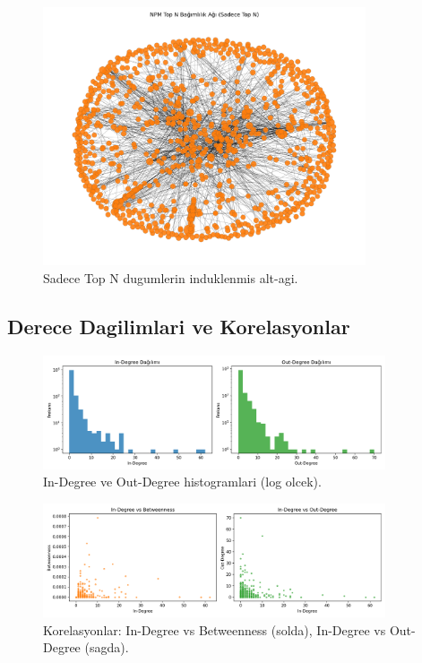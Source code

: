 \documentclass[11pt,a4paper]{article}
\begin{document}
\begin{figure}[h]
  \centering
  \includegraphics[width=0.85\textwidth]{network_topN_only.png}
  \caption{Sadece Top N dugumlerin induklenmis alt-agi.}
\end{figure}

\subsection{Derece Dagilimlari ve Korelasyonlar}
\begin{figure}[h]
  \centering
  \includegraphics[width=0.90\textwidth]{degree_histograms.png}
  \caption{In-Degree ve Out-Degree histogramlari (log olcek).}
\end{figure}

\begin{figure}[h]
  \centering
  \includegraphics[width=0.90\textwidth]{scatter_correlations.png}
  \caption{Korelasyonlar: In-Degree vs Betweenness (solda), In-Degree vs Out-Degree (sagda).}
\end{figure}
\end{document}
